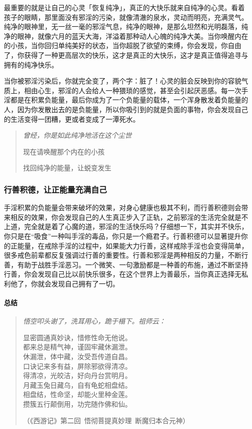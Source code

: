 最重要的就是让自己的心灵「恢复纯净」，真正的大快乐就来自纯净的心灵。看着孩子的眼睛，那里面没有邪淫的污染，就像清澈的泉水，灵动而明亮，充满灵气。纯净的眼神里，无一丝一毫的邪淫气息，纯净的眼神，是那么坦然和光明磊落，纯净的眼神，就像六月的蓝天大海，洋溢着那种动人心魄的纯净大美。当你唤醒内在的小孩，当你回归单纯美好的状态，当你超脱了欲望的束缚，你会发现，你自由了，你获得了一种更高层次的快乐，这才是真正的大快乐，这才是真正值得追寻与拥有的纯净快乐。

当你被邪淫污染后，你就完全变了，两个字：脏了！心灵的脏会反映到你的容貌气质上，相由心生，邪淫的人会给人一种猥琐的感觉，甚至会引起厌恶感。每一次手淫都是在积累负能量，最后你成为了一个负能量的载体，一个浑身散发着负能量的人，因为你发散出去的是负能量，所以你吸引到的就是负面的事物，你会发现自己的生活变得一团糟，更或者变成了一潭死水。

\begin{quotation}\it
    曾经，你是如此纯净地活在这个尘世

    现在请唤醒那个内在的小孩

    找回纯净的能量，让蜕变发生
\end{quotation}

\subsubsection{行善积德，让正能量充满自己}

手淫积累的负能量会带来破坏的效果，对身心健康也极其不利，而行善积德则会带来相反的效果，你会发现自己的人生真正步入了正轨，之前邪淫的生活完全就是不上道，完全就是着了心魔的道，邪淫的生活快乐吗？仔细想一下，其实并不快乐，你只是在“吸食”一种叫手淫的毒品，你只是一个瘾君子。行善积德可以显著提升你的正能量，在戒除手淫的过程中，如果能大力行善，这样戒除手淫也会变得简单，很多戒色前辈都反复强调过行善的重要性。行善和邪淫是两种相反的力量，不断行善，有助于战胜手淫恶习。一个微笑、一句激励都是一种善的布施，通过不断坚持行善，你会发现自己比以前快乐很多，在这个世界上为善最乐，当你真正选择无私利他了，你就会发现自己拥有了一切。

\paragraph*{总结}

\begin{quote}\it
    悟空叩头谢了，洗耳用心，跪于榻下。祖师云：
    \begin{center}
        显密圆通真妙诀，惜修性命无他说。 \\ 都来总是精气神，谨固牢藏休漏泄。 \\ 休漏泄，体中藏，汝受吾传道自昌。 \\ 口诀记来多有益，屏除邪欲得清凉。 \\ 得清凉，光皎洁，好向丹台赏明月。 \\ 月藏玉兔日藏乌，自有龟蛇相盘结。 \\ 相盘结，性命坚，却能火里种金莲。 \\ 攒簇五行颠倒用，功完随作佛和仙。
    \end{center}（《西游记》第二回\ 悟彻菩提真妙理\ 断魔归本合元神）
\end{quote}

